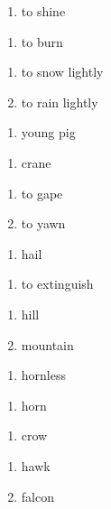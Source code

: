 \begin{enumerate}
\item to shine
\end{enumerate}
\begin{enumerate}
\item to burn
\end{enumerate}
\begin{enumerate}
\item to snow lightly
\item to rain lightly
\end{enumerate}
\begin{enumerate}
\item young pig
\end{enumerate}
\begin{enumerate}
\item crane
\end{enumerate}
\begin{enumerate}
\item to gape
\item to yawn
\end{enumerate}
\begin{enumerate}
\item hail
\end{enumerate}
\begin{enumerate}
\item to extinguish
\end{enumerate}
\begin{enumerate}
\item hill
\item mountain
\end{enumerate}
\begin{enumerate}
\item hornless
\end{enumerate}
\begin{enumerate}
\item horn
\end{enumerate}
\begin{enumerate}
\item crow
\end{enumerate}
\begin{enumerate}
\item hawk
\item falcon
\end{enumerate}
